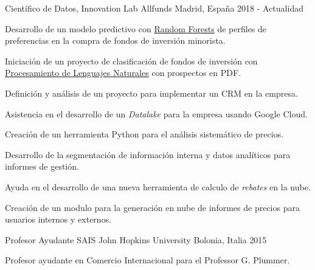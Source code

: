 

\begin{cventries}

\cventry
    {Científico de Datos, Innovation Lab} %
    {Allfunds} %
    {Madrid, España} %
    {2018 - Actualidad} %
    {
        \begin{cvitems} %
            \item {Desarrollo de un modelo predictivo con \href{https://es.wikipedia.org/wiki/Random_forest}{Random Forests} de perfiles de preferencias en la compra de fondos de inversión minorista.}
            \item {Iniciación de un proyecto de clasificación de fondos de inversión con \href{https://es.wikipedia.org/wiki/Procesamiento_de_lenguajes_naturales}{Procesamiento de Lenguajes Naturales} con prospectos en PDF.}
            \item {Definición y análisis de un proyecto para implementar un CRM en la empresa.}
            \item {Asistencia en el desarrollo de un \textit{Datalake} para la empresa usando Google Cloud.}
            \item {Creación de un herramienta Python para el análisis sistemático de precios.}
            \item {Desarrollo de la segmentación de información interna y datos analíticos para informes de gestión.}
            \item {Ayuda en el desarrollo de una nueva herramienta de calculo de \textit{rebates} en la nube.}
            \item {Creación de un modulo para la generación en nube de informes de precios para usuarios internos y externos.}
        \end{cvitems}
    }

\cventry
    {Profesor Ayudante} %
    {SAIS John Hopkins University} %
    {Bolonia, Italia} %
    {2015} %
    {
        \begin{cvitems} %
            \item {Profesor ayudante en Comercio Internacional para el Professor G. Plummer.}
        \end{cvitems}
    }


\end{cventries}
